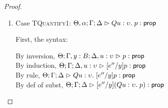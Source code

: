 \begin{proof}
\begin{enumerate}
  First, the syntax:
  \begin{tabbedproof}
    \oo By inversion, $\judgeA[\Theta; \Gamma, y:B; \Delta]{p}{\assert}$\\
    \oo By inversion, $\judgeA[\Theta; \Gamma, y:B; \Delta]{q}{\assert}$\\
    \oo By induction, $\judgeA[\Theta; \Gamma; \Delta]{[e''/y]p}{\assert}$\\
    \oo By induction, $\judgeA[\Theta; \Gamma; \Delta]{[e''/y]q}{\assert}$\\
    \oo By rule, $\judgeA[\Theta; \Gamma; \Delta]{[e''/y]p \oplus [e''/y]q}{\assert}$\\
    \oo By subst def, $\judgeA[\Theta; \Gamma; \Delta]{[e''/y](p \oplus q)}{\assert}$\\
  \end{tabbedproof}

  For semantics, consider $\interp{\judgeA[\Theta; \Gamma; \Delta]{[e''/y](p \oplus q)}{\assert}}\;\theta\;\gamma\;\delta$
  \begin{eqnproof}
    {Semantics}
    {Induction}
          {Semantics}
  \end{eqnproof}

\item Case \textsc{TQuantify1}: $\judgeA[\Theta, \alpha; \Gamma; \Delta]{Q u:\upsilon.\;p}{\assert}$
  
  First, the syntax:
  \begin{tabbedproof}
    \oo By inversion, $\judgeA[\Theta; \Gamma, y:B; \Delta, u:\upsilon]{p}{\assert}$ \\
    \oo By induction, $\judgeA[\Theta; \Gamma; \Delta, u:\upsilon]{[e''/y]p}{\assert}$ \\
    \oo By rule, $\judgeA[\Theta; \Gamma; \Delta]
                         {Q u:\upsilon.\;[e''/y]p}{\assert}$ \\
    \oo By def of subst, $\judgeA[\Theta; \Gamma; \Delta]
                                 {[e''/y](Q u:\upsilon.\;p)}{\assert}$ 
  \end{tabbedproof}


\end{enumerate}
\end{proof}
